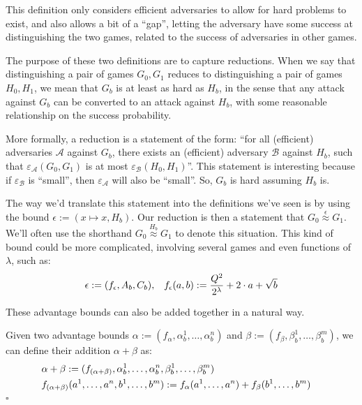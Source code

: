 This definition only considers efficient adversaries to allow for
hard problems to exist, and also allows a bit of a ``gap'',
letting the adversary have some success at distinguishing
the two games, related to the success of adversaries in other games.

The purpose of these two definitions are to capture reductions.
When we say that distinguishing a pair of games $G_0, G_1$ reduces
to distinguishing a pair of games $H_0, H_1$, we mean that
$G_b$ is at least as hard as $H_b$, in the sense that
any attack against $G_b$ can be converted to an attack against $H_b$,
with some reasonable relationship on the success probability.

More formally, a reduction is a statement of the form:
``for all (efficient) adversaries $\mathcal{A}$
against $G_b$, there exists an (efficient) adversary $\mathcal{B}$
against $H_b$, such that $\varepsilon_{\mathcal{A}}(G_0, G_1)$
is at most $\varepsilon_{\mathcal{B}}(H_0, H_1)$''.
This statement is interesting because if $\varepsilon_{\mathcal{B}}$
is ``small'', then $\varepsilon_{\mathcal{A}}$ will also be ``small''.
So, $G_b$ is hard assuming $H_b$ is.

The way we'd translate this statement into the definitions we've
seen is by using the bound $\epsilon := (x \mapsto x, H_b)$.
Our reduction is then a statement that $G_0 \overset{\epsilon}{\approx} G_1$.
We'll often use the shorthand $G_0 \overset{H_b}{\approx} G_1$ to denote
this situation.
This kind of bound could be more complicated, involving several games and even
functions of $\lambda$, such as:
$$
\begin{aligned}
&\epsilon := (f_\epsilon, A_b, C_b),
&f_\epsilon(a, b) := \frac{Q^2}{2^{\lambda}} + 2 \cdot a + \sqrt{b}\cr
\end{aligned}
$$

These advantage bounds can also be added together
in a natural way.

\begin{definition}
    Given two advantage bounds $\alpha := (f_\alpha, \alpha^1_b, \ldots, \alpha^n_b)$
    and $\beta := (f_\beta, \beta^1_b, \ldots, \beta^m_b)$, we can define
    their addition $\alpha + \beta$ as:
    $$
    \begin{aligned}
    &\alpha + \beta := (f_{(\alpha + \beta)}, \alpha^1_b, \ldots, \alpha^n_b, \beta^1_b, \ldots, \beta^m_b)\cr
    &f_{(\alpha + \beta)}(a^1, \ldots, a^n, b^1, \ldots, b^m) := f_\alpha(a^1, \ldots, a^n) + f_\beta(b^1, \ldots, b^m)
    \end{aligned}
    $$
    $\square$
\end{definition}

